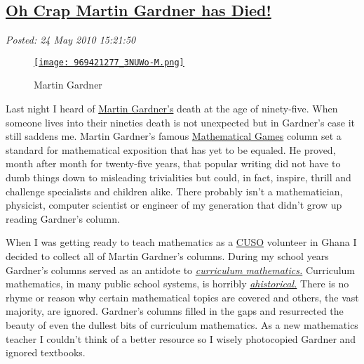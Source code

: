 %

\subsection*{\href{https://bakerjd99.wordpress.com/2010/05/24/oh-crap-martin-gardner-has-died/}{Oh Crap Martin Gardner has Died!}}


\noindent\emph{Posted: 24 May 2010 15:21:50}
\vspace{6pt}


\captionsetup[figure]{labelformat=empty}
\begin{figure}[htbp]
\centering
\href{http://www.mathpuzzle.com/28Jun04.html}{\texttt{[image: 969421277\_3NUWo-M.png]}}
\caption{Martin  Gardner}
\label{fig:526X0}
\end{figure}


Last night I heard of
\href{http://en.wikipedia.org/wiki/Martin\_Gardner}{Martin Gardner's}
death at the age of ninety-five. When someone lives into their nineties
death is not unexpected but in Gardner's case it still saddens me.
Martin Gardner's famous
\href{http://www.amazon.com/Martin-Gardners-Mathematical-Games-Gardner/dp/0883855453}{Mathematical
Games} column set a standard for mathematical exposition that has yet to
be equaled. He proved, month after month for twenty-five years, that
popular writing did not have to dumb things down to misleading
trivialities but could, in fact, inspire, thrill and challenge
specialists and children alike. There probably isn't a mathematician,
physicist, computer scientist or engineer of my generation that didn't
grow up reading Gardner's column.

When I was getting ready to teach mathematics as a
\href{http://www.cuso-vso.org/}{CUSO} volunteer in Ghana I decided to
collect all of Martin Gardner's columns. During my school years
Gardner's columns served as an antidote to
\emph{\href{http://www2.edc.org/mcc/}{curriculum mathematics.}}
Curriculum mathematics, in many public school systems, is horribly
\emph{\href{http://wordnetweb.princeton.edu/perl/webwn?s=ahistorical}{ahistorical.}}
There is no rhyme or reason why certain mathematical topics are covered
and others, the vast majority, are ignored. Gardner's columns filled in
the gaps and resurrected the beauty of even the dullest bits of
curriculum mathematics. As a new mathematics teacher I couldn't think of
a better resource so I wisely photocopied Gardner and ignored textbooks.

